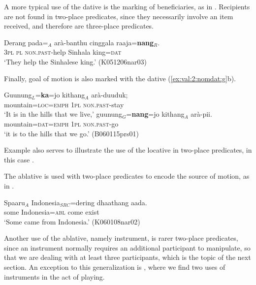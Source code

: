 \documentclass[a4paper,10pt]{article}
\begin{document}
A more typical use of the dative is the marking of beneficiaries, as in . Recipients are not found in two-place predicates, since they necessarily involve an item received, and therefore are three-place predicates.

\ea\label{ex:val:2:nomdat:b}
\gll Derang pada=\zero{}$_{A}$ arà-banthu cinggala  raaja=\textbf{nang}$_{R}$. \\
     \textsc{3pl} \textsc{pl} \textsc{non.past}-help Sinhala king=\textsc{dat}  \\
    `They help the Sinhalese king.' (K051206nar03)
\z

Finally, goal of  motion is also marked with the dative (\ref{ex:val:2:nomdat:g}b).



\ea\label{ex:val:2:nomdat:g}
\ea
\gll Guunung$_{L}$=\textbf{ka}=jo kithang$_{A}$ arà-duuduk;  \\
      mountain=\textsc{loc}=\textsc{emph} \textsc{1pl} \textsc{non.past}-stay \\
    `It is in the hills that we live,' 
\ex
\gll guunung$_{G}$=\textbf{nang}=jo kithang$_{A}$ arà-pii.\\
    mountain=\textsc{dat}=\textsc{emph} \textsc{1pl} \textsc{non.past}-go \\
    `it is to the hills that we go.' (B060115prs01)
\z
\z

Example  also serves to illustrate the use of the locative in two-place predicates, in this case .
 
% 
% 

The ablative is used with two-place predicates to encode the source of motion, as in .

\ea\label{ex:val:2:nomabl:src} 
\gll Spaaru$_{A}$  Indonesia$_{SRC}$=dering      dhaathang aada. \\
some Indonesia=\textsc{abl} come exist \\
`Some came from Indonesia.' (K060108nar02)
\z

Another use of the ablative, namely instrument, is rarer two-place predicates, since an instrument normally requires an additional participant to manipulate, so that we are dealing with at least three participants, which is the topic of the next section. An exception to this generalization is  , where we find two uses of instruments in the act of playing.
 
\end{document}
